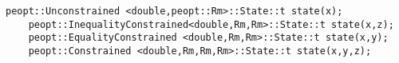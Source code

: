 \begin{lstlisting}[style=C++]
    peopt::Unconstrained <double,peopt::Rm>::State::t state(x);
    peopt::InequalityConstrained<double,Rm,Rm>::State::t state(x,z);
    peopt::EqualityConstrained <double,Rm,Rm>::State::t state(x,y);
    peopt::Constrained <double,Rm,Rm,Rm>::State::t state(x,y,z);
\end{lstlisting}
